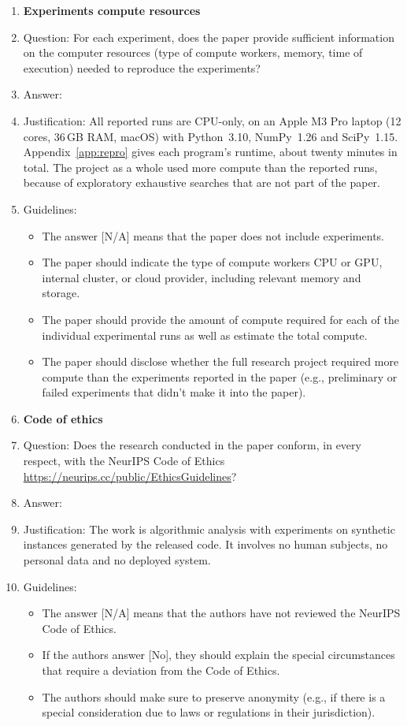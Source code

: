 \begin{enumerate}
\item {\bf Experiments compute resources}
    \item[] Question: For each experiment, does the paper provide sufficient information on the computer resources (type of compute workers, memory, time of execution) needed to reproduce the experiments?
    \item[] Answer: \answerYes{}
    \item[] Justification: All reported runs are CPU-only, on an Apple M3 Pro laptop (12 cores, 36\,GB RAM, macOS) with Python~3.10, NumPy~1.26 and SciPy~1.15. Appendix~\ref{app:repro} gives each program's runtime, about twenty minutes in total. The project as a whole used more compute than the reported runs, because of exploratory exhaustive searches that are not part of the paper.
    \item[] Guidelines:
    \begin{itemize}
        \item The answer [N/A] means that the paper does not include experiments.
        \item The paper should indicate the type of compute workers CPU or GPU, internal cluster, or cloud provider, including relevant memory and storage.
        \item The paper should provide the amount of compute required for each of the individual experimental runs as well as estimate the total compute.
        \item The paper should disclose whether the full research project required more compute than the experiments reported in the paper (e.g., preliminary or failed experiments that didn't make it into the paper).
    \end{itemize}

\item {\bf Code of ethics}
    \item[] Question: Does the research conducted in the paper conform, in every respect, with the NeurIPS Code of Ethics \url{https://neurips.cc/public/EthicsGuidelines}?
    \item[] Answer: \answerYes{}
    \item[] Justification: The work is algorithmic analysis with experiments on synthetic instances generated by the released code. It involves no human subjects, no personal data and no deployed system.
    \item[] Guidelines:
    \begin{itemize}
        \item The answer [N/A] means that the authors have not reviewed the NeurIPS Code of Ethics.
        \item If the authors answer [No], they should explain the special circumstances that require a deviation from the Code of Ethics.
        \item The authors should make sure to preserve anonymity (e.g., if there is a special consideration due to laws or regulations in their jurisdiction).
    \end{itemize}


\end{enumerate}
